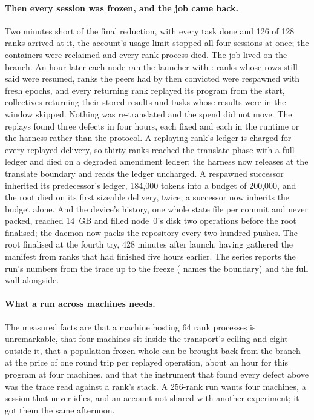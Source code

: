 \paragraph{Then every session was frozen, and the job came back.} Two minutes
short of the final reduction, with every task done and 126 of 128 ranks arrived
at it, the account's usage limit stopped all four sessions at once; the
containers were reclaimed and every rank process died. The job lived on the
branch. An hour later each node ran the launcher with : ranks whose
rows still said  were resumed, ranks the peers had by then convicted
were respawned with fresh epochs, and every returning rank replayed its program
from the start, collectives returning their stored results and tasks whose
results were in the window skipped. Nothing was re-translated and the spend did
not move. The replays found three defects in four hours, each fixed and each
in the runtime or the harness rather than the protocol. A replaying rank's ledger
is charged for every replayed delivery, so thirty ranks reached the translate
phase with a full ledger and died on a degraded amendment ledger; the harness now
releases at the translate boundary and reads the ledger uncharged. A respawned
successor inherited its predecessor's ledger, 184,000 tokens into a budget of
200,000, and the root died on its first sizeable delivery, twice; a successor
now inherits the budget alone. And the device's history, one whole state file per
commit and never packed, reached 14~GB and filled node~0's disk two operations
before the root finalised; the daemon now packs the repository every two hundred
pushes. The root finalised at the fourth try, 428 minutes after launch, having
gathered the manifest from ranks that had finished five hours earlier. The
series reports the run's numbers from the trace up to the freeze
( names the boundary) and the full wall alongside.

\paragraph{What a run across machines needs.} The measured facts are that a
machine hosting 64 rank processes is unremarkable, that four machines sit inside
the transport's ceiling and eight outside it, that a population frozen whole can
be brought back from the branch at the price of one round trip per replayed
operation, about an hour for this program at four machines, and that the
instrument that found every defect above was the trace read against a rank's
stack. A 256-rank run wants four machines, a session that never idles, and an account
not shared with another experiment; it got them the same afternoon.

